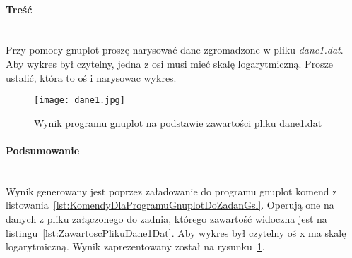 \paragraph{Treść}~\\
Przy pomocy gnuplot proszę narysować dane zgromadzone w pliku \textit{dane1.dat}.
Aby wykres był czytelny, jedna z osi musi mieć skalę logarytmiczną.
Prosze ustalić, która to oś i narysowac wykres.





\begin{figure}[h]
  \caption{Wynik programu gnuplot na podstawie zawartości pliku dane1.dat}
  \label{fig:WynikProgramuGnuplotNaPodstawieZawartosciPlikuDane1Dat}
  \centering
  \texttt{[image: dane1.jpg]}
\end{figure}

\paragraph{Podsumowanie}~\\
Wynik generowany jest poprzez załadowanie do programu gnuplot komend z listowania~\ref{lst:KomendyDlaProgramuGnuplotDoZadanGsl}.
Operują one na danych z pliku załączonego do zadnia, którego zawartość widoczna jest na listingu~\ref{lst:ZawartoscPlikuDane1Dat}.
Aby wykres był czytelny oś x ma skalę logarytmiczną.
Wynik zaprezentowany został na rysunku~\ref{fig:WynikProgramuGnuplotNaPodstawieZawartosciPlikuDane1Dat}.
